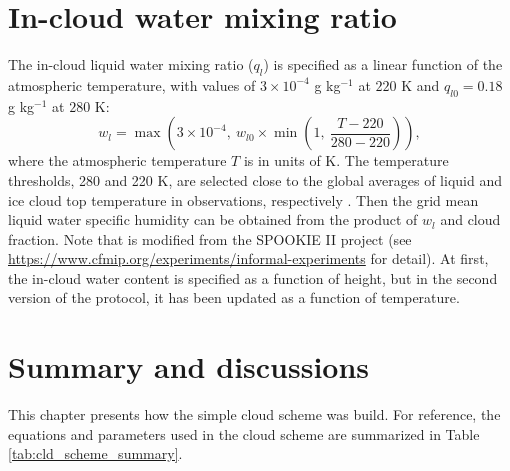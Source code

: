 \section{In-cloud water mixing ratio}

The in-cloud liquid water mixing ratio ($q_l$) is specified as a linear function of the atmospheric temperature, with values of $3\times 10^{-4}$ g kg$^{-1}$ at $220$ K and $q_{l0}=0.18$ g kg$^{-1}$ at $280$ K:
\begin{equation}
	w_l = \max\left(3\times 10^{-4}, ~w_{l0}\times  \min\left(1, ~\frac{T-220}{280-220}\right)\right),
	\label{eq:qcl}
\end{equation}
where the atmospheric temperature $T$ is in units of K. The temperature thresholds, 280 and 220 K, are selected close to the global averages of liquid and ice cloud top temperature in observations, respectively \citep[Fig. 4 in][]{Stubenrauch2013}. Then the grid mean liquid water specific humidity can be obtained from the product of $w_l$ and cloud fraction. Note that  is modified from the SPOOKIE II project (see \url{https://www.cfmip.org/experiments/informal-experiments} for detail). At first, the in-cloud water content is specified as a function of height, but in the second version of the protocol, it has been updated as a function of temperature.

\section{Summary and discussions}

This chapter presents how the simple cloud scheme was build. For reference, the equations and parameters used in the cloud scheme are summarized in Table \ref{tab:cld_scheme_summary}. 

